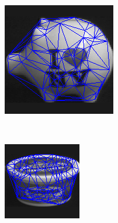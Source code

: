 \documentclass[10pt,a4paper]{article}
\begin{document}
\begin{figure}[H]
\begin{subfigure}[b]{0.15\textwidth}
		\includegraphics[width= \textwidth]{images/ToySuperimpose.png}
		\caption{}
		\label{}
	\end{subfigure}~
    \begin{subfigure}[b]{0.15\textwidth}
    	\includegraphics[width= \textwidth]{images/IcecreamSuperimpose.png}

\end{subfigure}
\end{figure}
\end{document}
